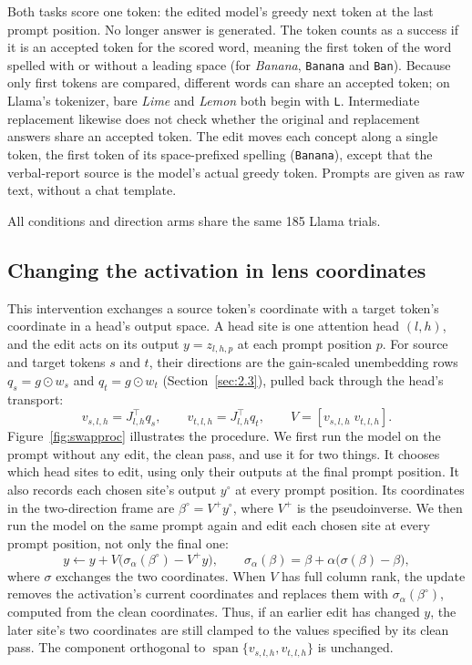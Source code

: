 \documentclass[11pt,a4paper]{article}
\newcommand{\code}[1]{\texttt{#1}}       %
\begin{document}
Both tasks score one token: the edited model's greedy next token at the last prompt position. No longer answer is generated. The token counts as a success if it is an accepted token for the scored word, meaning the first token of the word spelled with or without a leading space (for \emph{Banana}, \code{\textvisiblespace{}Banana} and \code{Ban}). Because only first tokens are compared, different words can share an accepted token; on Llama's tokenizer, bare \emph{Lime} and \emph{Lemon} both begin with \code{L}. Intermediate replacement likewise does not check whether the original and replacement answers share an accepted token. The edit moves each concept along a single token, the first token of its space-prefixed spelling (\code{\textvisiblespace{}Banana}), except that the verbal-report source is the model's actual greedy token. Prompts are given as raw text, without a chat template.

All conditions and direction arms share the same 185 Llama trials.

\subsection{Changing the activation in lens coordinates}\label{sec:4.2}

This intervention exchanges a source token's coordinate with a target token's coordinate in a head's output space. A head site is one attention head $(l,h)$, and the edit acts on its output $y=z_{l,h,p}$ at each prompt position $p$. For source and target tokens $s$ and $t$, their directions are the gain-scaled unembedding rows $q_s=g\odot w_s$ and $q_t=g\odot w_t$ (Section~\ref{sec:2.3}), pulled back through the head's transport:
\[
v_{s,l,h}=J_{l,h}^{\top}q_s,\qquad
v_{t,l,h}=J_{l,h}^{\top}q_t,\qquad
V=[v_{s,l,h}\;v_{t,l,h}].
\]
Figure~\ref{fig:swapproc} illustrates the procedure. We first run the model on the prompt without any edit, the clean pass, and use it for two things. It chooses which head sites to edit, using only their outputs at the final prompt position. It also records each chosen site's output $y^\circ$ at every prompt position. Its coordinates in the two-direction frame are $\beta^\circ=V^+y^\circ$, where $V^+$ is the pseudoinverse. We then run the model on the same prompt again and edit each chosen site at every prompt position, not only the final one:
\[
y\leftarrow y+V\big(\sigma_\alpha(\beta^\circ)-V^+y\big),\qquad
\sigma_\alpha(\beta)=\beta+\alpha\big(\sigma(\beta)-\beta\big),
\]
where $\sigma$ exchanges the two coordinates. When $V$ has full column rank, the update removes the activation's current coordinates and replaces them with $\sigma_\alpha(\beta^\circ)$, computed from the clean coordinates. Thus, if an earlier edit has changed $y$, the later site's two coordinates are still clamped to the values specified by its clean pass. The component orthogonal to $\operatorname{span}\{v_{s,l,h},v_{t,l,h}\}$ is unchanged.
\end{document}
